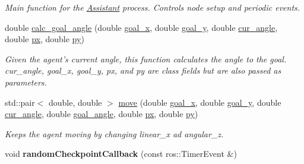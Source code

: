 \begin{DoxyCompactItemize}
\begin{DoxyCompactList}\small\item\em Main function for the \hyperlink{classAssistant}{Assistant} process. Controls node setup and periodic events. \end{DoxyCompactList}\item 
double \hyperlink{classAssistant_a8fce345025f32bcd0e45d83960d4b3f7}{calc\-\_\-goal\-\_\-angle} (double \hyperlink{classAssistant_a1a1f1fe48d0eb6a6a39b7fbdb2ef6641}{goal\-\_\-x}, double \hyperlink{classAssistant_a1b6ce5d7c3124140be8d351c847fe91c}{goal\-\_\-y}, double \hyperlink{classAssistant_a451a20f551c43d0b6810c8208fe84773}{cur\-\_\-angle}, double \hyperlink{classAssistant_a694fdaa5fb378340c42b7f75716cd1ce}{px}, double \hyperlink{classAssistant_ae092b444c226b5ffbdf454ad24f630d6}{py})
\begin{DoxyCompactList}\small\item\em Given the agent's current angle, this function calculates the angle to the goal. cur\-\_\-angle, goal\-\_\-x, goal\-\_\-y, px, and py are class fields but are also passed as parameters. \end{DoxyCompactList}\item 
std\-::pair$<$ double, double $>$ \hyperlink{classAssistant_ac420c9d5551f0ef6925d9a58a5b4854a}{move} (double \hyperlink{classAssistant_a1a1f1fe48d0eb6a6a39b7fbdb2ef6641}{goal\-\_\-x}, double \hyperlink{classAssistant_a1b6ce5d7c3124140be8d351c847fe91c}{goal\-\_\-y}, double \hyperlink{classAssistant_a451a20f551c43d0b6810c8208fe84773}{cur\-\_\-angle}, double \hyperlink{classAssistant_ae4468e02db193f0ffa0ca17a249f802d}{goal\-\_\-angle}, double \hyperlink{classAssistant_a694fdaa5fb378340c42b7f75716cd1ce}{px}, double \hyperlink{classAssistant_ae092b444c226b5ffbdf454ad24f630d6}{py})
\begin{DoxyCompactList}\small\item\em Keeps the agent moving by changing linear\-\_\-x ad angular\-\_\-z. \end{DoxyCompactList}\item 
\hypertarget{classAssistant_a320ca71cccf4964b341820db82b4b604}{void {\bfseries random\-Checkpoint\-Callback} (const ros\-::\-Timer\-Event \&)}\label{classAssistant_a320ca71cccf4964b341820db82b4b604}


\end{DoxyCompactItemize}
